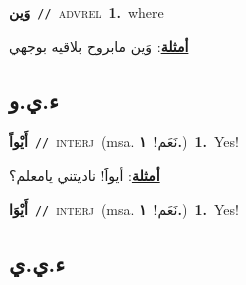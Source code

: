 \documentclass[10pt,a4paper,twoside]{article} %
\begin{document}
\begin{multicols}{2}
{\setlength\topsep{0pt}\textbf{\foreignlanguage{arabic}{وَين}}\ {\color{gray}\texttt{//}\color{black}}\ \textsc{adv\textunderscore rel}\ \textbf{1.}~where\  \begin{flushright}\color{gray}\foreignlanguage{arabic}{\textbf{\underline{\foreignlanguage{arabic}{أمثلة}}}: وَين مابروح بلاقيه بوجهي}\end{flushright}\color{black}} \vspace{2mm}

\vspace{-3mm}
\subsection*{\color{blue}\foreignlanguage{arabic}{ء.ي.و}\color{blue}{ (ntws)}} 

{\setlength\topsep{0pt}\textbf{\foreignlanguage{arabic}{أَيْواً}}\ {\color{gray}\texttt{//}\color{black}}\ \textsc{interj}\ \color{gray}(msa. \foreignlanguage{arabic}{نَعَم!}~\foreignlanguage{arabic}{\textbf{١.}})\color{black}\ \textbf{1.}~Yes!\  \begin{flushright}\color{gray}\foreignlanguage{arabic}{\textbf{\underline{\foreignlanguage{arabic}{أمثلة}}}: أيواََ! ناديتني يامعلم؟}\end{flushright}\color{black}} \vspace{2mm}

{\setlength\topsep{0pt}\textbf{\foreignlanguage{arabic}{أَيْوَا}}\ {\color{gray}\texttt{//}\color{black}}\ \textsc{interj}\ \color{gray}(msa. \foreignlanguage{arabic}{نَعَم!}~\foreignlanguage{arabic}{\textbf{١.}})\color{black}\ \textbf{1.}~Yes!\ } \vspace{2mm}

\vspace{-3mm}
\subsection*{\color{blue}\foreignlanguage{arabic}{ء.ي.ي}\color{blue}{}} 


\end{multicols}
\end{document}
